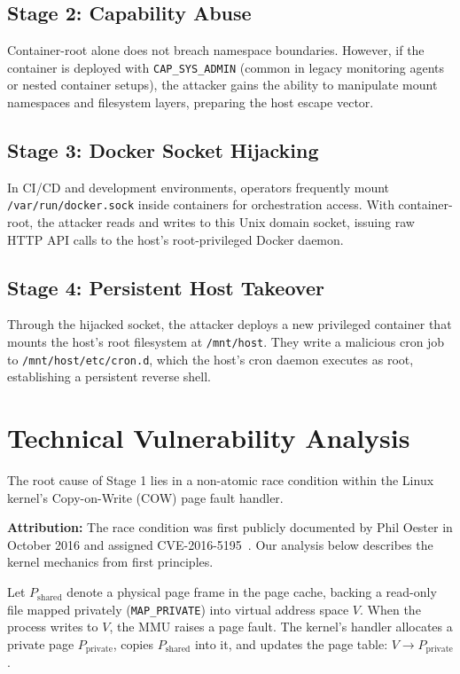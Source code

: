 \documentclass[conference]{IEEEtran}
\begin{document}
\subsection{Stage 2: Capability Abuse}
Container-root alone does not breach namespace boundaries. However, if the container is deployed with \texttt{CAP\_SYS\_ADMIN} (common in legacy monitoring agents or nested container setups), the attacker gains the ability to manipulate mount namespaces and filesystem layers, preparing the host escape vector.

\subsection{Stage 3: Docker Socket Hijacking}
In CI/CD and development environments, operators frequently mount \texttt{/var/run/docker.sock} inside containers for orchestration access. With container-root, the attacker reads and writes to this Unix domain socket, issuing raw HTTP API calls to the host's root-privileged Docker daemon.

\subsection{Stage 4: Persistent Host Takeover}
Through the hijacked socket, the attacker deploys a new privileged container that mounts the host's root filesystem at \texttt{/mnt/host}. They write a malicious cron job to \texttt{/mnt/host/etc/cron.d}, which the host's cron daemon executes as root, establishing a persistent reverse shell.

\section{Technical Vulnerability Analysis}
The root cause of Stage 1 lies in a non-atomic race condition within the Linux kernel's Copy-on-Write (COW) page fault handler.

\textbf{Attribution:} The race condition was first publicly documented by Phil Oester in October 2016 and assigned CVE-2016-5195~\cite{b1}. Our analysis below describes the kernel mechanics from first principles.

Let $P_{\text{shared}}$ denote a physical page frame in the page cache, backing a read-only file mapped privately (\texttt{MAP\_PRIVATE}) into virtual address space $V$. When the process writes to $V$, the MMU raises a page fault. The kernel's handler allocates a private page $P_{\text{private}}$, copies $P_{\text{shared}}$ into it, and updates the page table: $V \rightarrow P_{\text{private}}$.
\end{document}
